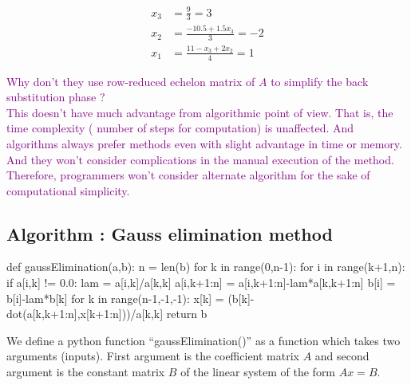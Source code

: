 \begin{align*} x_3 & = \frac{9}{3} = 3 \\  x_2 & = \frac{-10.5 + 1.5x_3}{3} = -2 \\ x_1 & = \frac{11-x_3+2x_2}{4}=1 \end{align*}

\begin{remark}\textcolor{purple}{Why don't they use row-reduced echelon matrix of $A$ to simplify the back substitution phase ?}\\

\textcolor{purple}{This doesn't have much advantage from algorithmic point of view. That is, the time complexity ( number of steps for computation) is unaffected. And algorithms always prefer methods even with slight advantage in time or memory. And they won't consider complications in the manual execution of the method. Therefore, programmers won't consider alternate algorithm for the sake of computational simplicity.}
\end{remark}

\subsection{Algorithm : Gauss elimination method}
\begin{program}
	\begin{python}
	def gaussElimination(a,b):
		n = len(b)
		for k in range(0,n-1):
			for i in range(k+1,n):
				if a[i,k] != 0.0:
					lam = a[i,k]/a[k,k]
					a[i,k+1:n] = a[i,k+1:n]-lam*a[k,k+1:n]
					b[i] = b[i]-lam*b[k]
		for k in range(n-1,-1,-1):
			x[k] = (b[k]-dot(a[k,k+1:n],x[k+1:n]))/a[k,k]
		return b
	\end{python}
\end{program}

\begin{remark}
	We define a python function ``gaussElimination()'' as a function which takes two arguments (inputs). First argument is the coefficient matrix $A$ and second argument is the constant matrix $B$ of the linear system of the form $Ax = B$.
\end{remark}

